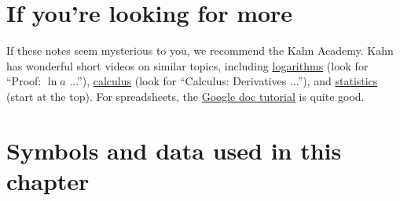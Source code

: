 \begin{enumerate}
\begin{comment}
\item (optional) A two-period consumption problem illustrates both
how to maximize a function and how consumers might decide how much to consume now
and how much to save for future spending.
Let us say that a consumer must choose how much to consume in period 1
(say, $c_1$)
and how much to consume in period 2 ($c_2$).
Preferences are represented by a utility function such as
\[
    u(c_1,c_2) \;=\; \ln c_1 + \beta \ln c_2 ,
\]
where log is a convenient function (note that it has diminishing marginal utility)
and $\beta< 1$ discounts period-2 utility relative to period-1.
The consumer maximizes this function subject to the budget constraint,
\[
    c_1 + c_2/(1+r) \;=\;  y_1 + y_2/(1+r) \;=\; V,
\]
where $r$ is the interest rate.
In words:  the present value of consumption equals the present value of income.
We denote the latter by $V$ to save ourselves some typing later on.
How much does the agent consume in period 1?

Answer.  Use the budget constraint to substitute for $c_2$ in the utility
function: $c_2 = (1+r) (V - c_1)$ and $ u(c_1,c_2) = \ln c_1 +
\beta \ln [(1+r)(V-c_1)] $. If we differentiate utility with
respect to $c_1$, we find
\[
    1/c_1 \;=\; \beta/(V-c_1)
\]
or $ c_1 = (1+\beta)^{-1} V$.]
\end{comment}
\end{enumerate}


\section*{If you're looking for more}

If these notes seem mysterious to you,
we recommend the Kahn Academy.
Kahn has wonderful short videos on similar topics,
including
\href{http://www.khanacademy.org/#algebra}{logarithms} (look for ``Proof:  $\ln a$ ...''),
\href{http://www.khanacademy.org/#calculus}{calculus} (look for ``Calculus:  Derivatives ...''),
and
\href{http://www.khanacademy.org/#statistics}{statistics} (start at the top).
For spreadsheets, the
\href{https://docs.google.com/support/bin/answer.py?hl=en&answer=140784&topic=20322&rd=1}
{Google doc tutorial}
is quite good.

\section*{Symbols and data used in this chapter}

